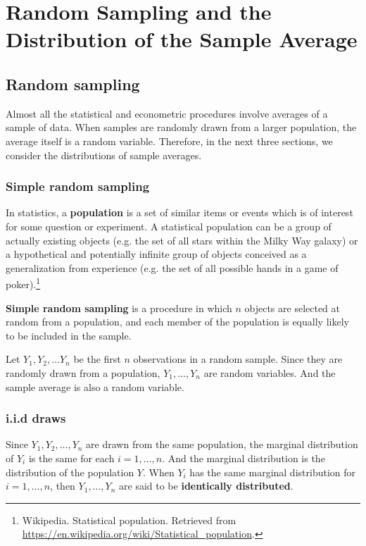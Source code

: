 \documentclass[a4paper,11pt]{article}
\begin{document}
\section{Random Sampling and the Distribution of the Sample Average}
\label{sec:org17d7365}

\subsection{Random sampling}
\label{sec:org360ed1d}

Almost all the statistical and econometric procedures involve averages
of a sample of data. When samples are randomly drawn from a larger
population, the average itself is a random variable. Therefore, in
the next three sections, we consider the distributions of sample
averages. 

\subsubsection*{Simple random sampling}
\label{sec:orga1cfd1c}

In statistics, a \textbf{population} is a set of similar items or events which
is of interest for some question or experiment. A statistical
population can be a group of actually existing objects (e.g. the set
of all stars within the Milky Way galaxy) or a hypothetical and
potentially infinite group of objects conceived as a generalization
from experience (e.g. the set of all possible hands in a game of
poker).\footnote{Wikipedia. Statistical population. Retrieved from
\url{https://en.wikipedia.org/wiki/Statistical\_population}.}

\textbf{Simple random sampling} is a procedure in which \(n\) objects are
selected at random from a population, and each member of the
population is equally likely to be included in the sample. 

Let \(Y_1, Y_2, \ldots Y_n\) be the first \(n\) observations in a random
sample. Since they are randomly drawn from a population, \(Y_1, \ldots,
Y_n\) are random variables. And the sample average is also a random
variable. 

\subsubsection*{i.i.d draws}
\label{sec:orgd668e93}

Since \(Y_1, Y_2, \ldots, Y_n\) are drawn from the same population, the
marginal distribution of \(Y_i\) is the same for each \(i=1, \ldots,
n\). And the marginal distribution is the distribution of the
population \(Y\). When \(Y_i\) has the same marginal distribution for
\(i=1, \ldots, n\), then \(Y_1, \ldots, Y_n\) are said to be \textbf{identically
distributed}. 
\end{document}
